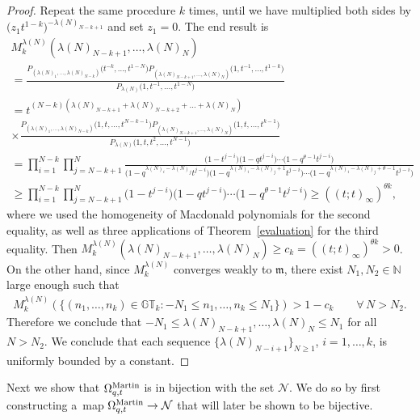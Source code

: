 \documentclass[pdftex]{sigma}
\numberwithin{equation}{section}
\newcommand{\N}{\mathbb{N}}
\newcommand{\Nu}{\mathcal{N}}
\newcommand{\GT}{\mathbb{GT}}
\newcommand{\Mart}{\Omega_{q, t}^{\rm Martin}}
\begin{document}
\begin{proof}
Repeat the same procedure $k$ times, until we have multiplied both sides by $\big(z_1t^{1-k}\big)^{-\lambda(N)_{N-k+1}}$ and set $z_1=0$. The end result is
\begin{gather*}
M_k^{\lambda(N)}\left(\lambda(N)_{N-k+1}, \dots, \lambda(N)_N\right)\\
= \frac{P_{(\lambda(N)_1, \dots, \lambda(N)_{N-k})}\big( t^{-k}, \dots, t^{1-N} \big) P_{ (\lambda(N)_{N-k+1}, \dots, \lambda(N)_N) }\big( 1, t^{-1}, \dots, t^{1-k} \big) }{ P_{ \lambda(N) }\big( 1, t^{-1}, \dots, t^{1-N} \big)}\\
= t^{(N - k) (\lambda(N)_{N-k+1} + \lambda(N)_{N-k+2} + \dots + \lambda(N)_N )}\\
\times\frac{P_{(\lambda(N)_1, \dots, \lambda(N)_{N-k})}\big(1, t, \dots, t^{N-k-1}\big) P_{(\lambda(N)_{N-k+1}, \dots, \lambda(N)_N)}\big(1, t, \dots, t^{k-1}\big)}{P_{\lambda(N)}\big(1, t, t^2, \dots, t^{N-1}\big)}\\
= \prod_{i=1}^{N-k}\prod_{j=N-k+1}^N\! {\frac{\big(1 - t^{j-i}\big)\big(1 - qt^{j-i}\big)\cdots \big(1 - q^{\theta - 1}t^{j-i}\big)}{\big(1 \!-\! q^{\lambda(N)_i - \lambda(N)_j}t^{j-i}\big)\big(1 \!-\! q^{\lambda(N)_i - \lambda(N)_j+1}t^{j-i}\big)\cdots \big(1 \!-\! q^{\lambda(N)_i - \lambda(N)_j+\theta-1}t^{j-i}\big)}}\\
\geq \prod_{i=1}^{N-k}\prod_{j=N-k+1}^N{\big(1 - t^{j-i}\big)\big(1 - qt^{j-i}\big)\cdots \big(1 - q^{\theta - 1}t^{j-i}\big)} \geq ( (t; t)_{\infty} )^{\theta k},
\end{gather*}
where we used the homogeneity of Macdonald polynomials for the second equality, as well as three applications of Theorem~\ref{evaluation} for the third equality. Then $M_k^{\lambda(N)}(\lambda(N)_{N-k+1}, \dots, \lambda(N)_N) \geq c_k = ( (t; t)_{\infty} )^{\theta k} > 0$.
On the other hand, since $M_k^{\lambda(N)}$ converges weakly to $\mathfrak{m}$, there exist $N_1, N_2\in\N$ large enough such that
\begin{gather*}
M_k^{\lambda(N)}(\{ (n_1, \dots, n_k)\in\GT_k\colon -N_1 \leq n_1, \dots, n_k \leq N_1 \}) > 1 - c_k \qquad \forall\, N > N_2.
\end{gather*}
Therefore we conclude that $-N_1 \leq \lambda(N)_{N - k +1}, \dots, \lambda(N)_N \leq N_1$ for all $N > N_2$.
We conclude that each sequence $\{\lambda(N)_{N - i + 1}\}_{N\geq 1}$, $i = 1, \dots, k$, is uniformly bounded by a constant.
\end{proof}

Next we show that $\Mart$ is in bijection with the set $\Nu$. We do so by f\/irst constructing a~map $\Mart \rightarrow \Nu$ that will later be shown to be bijective.
\end{document}
